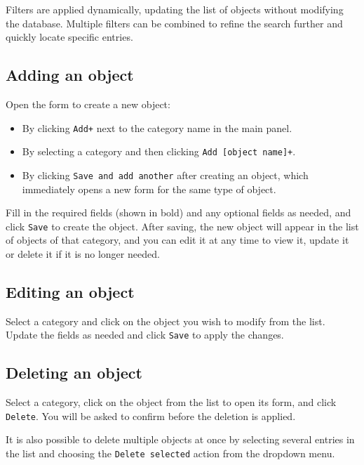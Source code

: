 Filters are applied dynamically, updating the list of objects without modifying the database. Multiple filters can be combined to refine the search further and quickly locate specific entries.



\subsection*{Adding an object}

Open the form to create a new object:

\begin{itemize}
	\item By clicking \texttt{Add+} next to the category name in the main panel.
	\item By selecting a category and then clicking \texttt{Add [object name]+}.
	\item By clicking \texttt{Save and add another} after creating an object, which immediately opens a new form for the same type of object.
\end{itemize}

	
Fill in the required fields (shown in bold) and any optional fields as needed, and click \texttt{Save} to create the object. After saving, the new object will appear in the list of objects of that category, and you can edit it at any time to view it, update it or delete it if it is no longer needed. 

\subsection*{Editing an object}

Select a category and click on the object you wish to modify from the list. Update the fields as needed and click \texttt{Save} to apply the changes.


\subsection*{Deleting an object}

Select a category, click on the object from the list to open its form, and click \texttt{Delete}. You will be asked to confirm before the deletion is applied.

It is also possible to delete multiple objects at once by selecting several entries in the list and choosing the \texttt{Delete selected} action from the dropdown menu.

